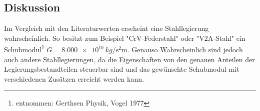 \newpage


\subsection{Diskussion}

Im Vergleich mit den Literaturwerten erscheint eine Stahllegierung wahrscheinlich. So besitzt zum Beispiel "CrV-Federstahl" oder "V2A-Stahl" ein Schubmodul\footnote{entnommen: Gerthsen Physik, Vogel 1977} $G=\SI{8.000 e10}{kg \per  \second \squared \metre}$.
Genauso Wahrscheinlich sind jedoch auch andere Stahllegierungen, da die Eigenschaften von den genauen Anteilen der Legierungsbestandteilen steuerbar sind und das gewünschte Schubmodul mit verschiedenen Zusätzen erreicht werden kann.









